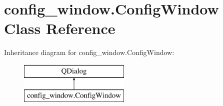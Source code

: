\hypertarget{classconfig__window_1_1_config_window}{}\section{config\+\_\+window.\+Config\+Window Class Reference}
\label{classconfig__window_1_1_config_window}
Inheritance diagram for config\+\_\+window.\+Config\+Window\+:\begin{figure}[H]
\begin{center}
\leavevmode
\includegraphics[height=2.000000cm]{d8/d9d/classconfig__window_1_1_config_window}
\end{center}
\end{figure}
